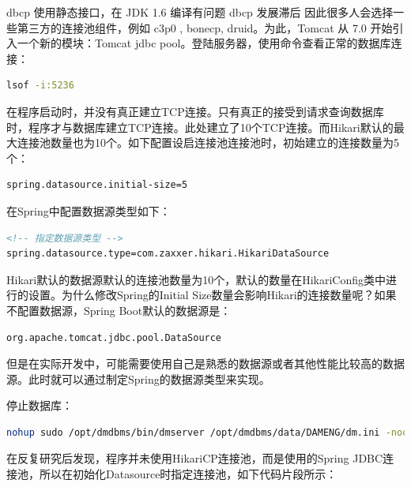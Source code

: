 \documentclass[12pt]{book}
\numberwithin{dummy}{section}
\theoremstyle{ocrenumbox}
\theoremstyle{blacknumex}
\theoremstyle{blacknumbox}
\theoremstyle{ocrenum}
\begin{document}
dbcp 使用静态接口，在 JDK 1.6 编译有问题
dbcp 发展滞后
因此很多人会选择一些第三方的连接池组件，例如 c3p0 , bonecp, druid。为此，Tomcat 从 7.0 开始引入一个新的模块：Tomcat jdbc pool。登陆服务器，使用命令查看正常的数据库连接：

\begin{lstlisting}[language=Bash]
lsof -i:5236
\end{lstlisting}

在程序启动时，并没有真正建立TCP连接。只有真正的接受到请求查询数据库时，程序才与数据库建立TCP连接。此处建立了10个TCP连接。而Hikari默认的最大连接池数量也为10个。如下配置设启连接池连接池时，初始建立的连接数量为5个：

\begin{lstlisting}
spring.datasource.initial-size=5
\end{lstlisting}

在Spring中配置数据源类型如下：

\begin{lstlisting}[language=XML]
<!-- 指定数据源类型 -->
spring.datasource.type=com.zaxxer.hikari.HikariDataSource
\end{lstlisting}

Hikari默认的数据源默认的连接池数量为10个，默认的数量在HikariConfig类中进行的设置。为什么修改Spring的Initial Size数量会影响Hikari的连接数量呢？如果不配置数据源，Spring Boot默认的数据源是：

\begin{lstlisting}
org.apache.tomcat.jdbc.pool.DataSource
\end{lstlisting}

但是在实际开发中，可能需要使用自己是熟悉的数据源或者其他性能比较高的数据源。此时就可以通过制定Spring的数据源类型来实现。

停止数据库：

\begin{lstlisting}[language=Bash]
nohup sudo /opt/dmdbms/bin/dmserver /opt/dmdbms/data/DAMENG/dm.ini -noconsole &
\end{lstlisting}

在反复研究后发现，程序并未使用HikariCP连接池，而是使用的Spring JDBC连接池，所以在初始化Datasource时指定连接池，如下代码片段所示：
\end{document}
